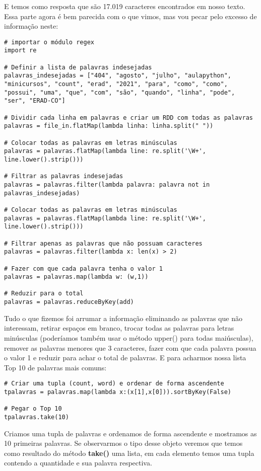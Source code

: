 E temos como resposta que são 17.019 caracteres encontrados em nosso texto. Essa parte agora é bem parecida com o que vimos, mas vou pecar pelo excesso de informação neste:
\begin{lstlisting}[]
# importar o módulo regex
import re

# Definir a lista de palavras indesejadas
palavras_indesejadas = ["404", "agosto", "julho", "aulapython", "minicursos", "count", "erad", "2021", "para", "como", "como", "possui", "uma", "que", "com", "são", "quando", "linha", "pode", "ser", "ERAD-CO"]

# Dividir cada linha em palavras e criar um RDD com todas as palavras
palavras = file_in.flatMap(lambda linha: linha.split(" "))

# Colocar todas as palavras em letras minúsculas
palavras = palavras.flatMap(lambda line: re.split('\W+', line.lower().strip()))

# Filtrar as palavras indesejadas
palavras = palavras.filter(lambda palavra: palavra not in palavras_indesejadas)

# Colocar todas as palavras em letras minúsculas
palavras = palavras.flatMap(lambda line: re.split('\W+', line.lower().strip()))

# Filtrar apenas as palavras que não possuam caracteres
palavras = palavras.filter(lambda x: len(x) > 2)

# Fazer com que cada palavra tenha o valor 1
palavras = palavras.map(lambda w: (w,1))

# Reduzir para o total
palavras = palavras.reduceByKey(add)
\end{lstlisting}

Tudo o que fizemos foi arrumar a informação eliminando as palavras que não interessam, retirar espaços em branco, trocar todas as palavras para letras minúsculas (poderíamos também usar o método upper() para todas maiúsculas), remover as palavras menores que 3 caracteres, fazer com que cada palavra possua o valor 1 e reduzir para achar o total de palavras. E para acharmos nossa lista Top 10 de palavras mais comuns:
\begin{lstlisting}[]
# Criar uma tupla (count, word) e ordenar de forma ascendente
tpalavras = palavras.map(lambda x:(x[1],x[0])).sortByKey(False)

# Pegar o Top 10
tpalavras.take(10)
\end{lstlisting}

Criamos uma tupla de palavras e ordenamos de forma ascendente e mostramos as 10 primeiras palavras. Se observarmos o tipo desse objeto veremos que temos como resultado do método \textbf{take()} uma lista, em cada elemento temos uma tupla contendo a quantidade e sua palavra respectiva. 

